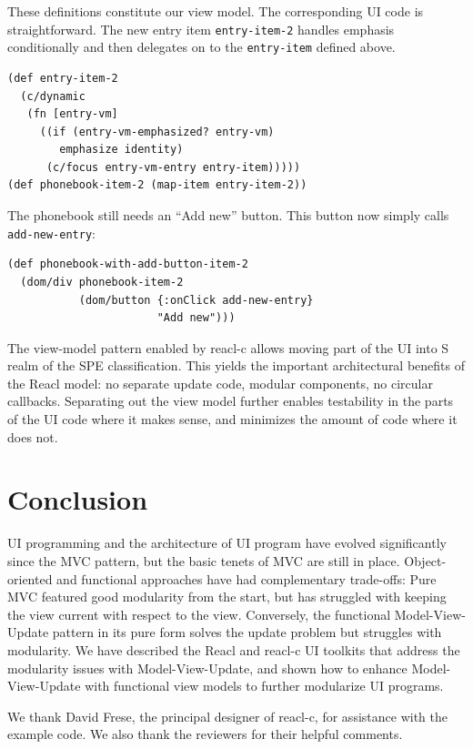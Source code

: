 \documentclass[sigplan,screen]{acmart}
\begin{document}
These definitions constitute our view model. The corresponding
UI code is straightforward. The new entry item \texttt{entry-item-2}
handles emphasis conditionally and then delegates on to the
\texttt{entry-item} defined above.
%
\begin{verbatim}
(def entry-item-2
  (c/dynamic
   (fn [entry-vm]
     ((if (entry-vm-emphasized? entry-vm)
        emphasize identity)
      (c/focus entry-vm-entry entry-item)))))
(def phonebook-item-2 (map-item entry-item-2))
\end{verbatim}
%
The phonebook still needs an ``Add new'' button. This button
now simply calls \texttt{add-new-entry}:
%
\begin{verbatim}
(def phonebook-with-add-button-item-2
  (dom/div phonebook-item-2
           (dom/button {:onClick add-new-entry}
                       "Add new")))
\end{verbatim}
%
The view-model pattern enabled by reacl-c allows moving part of the UI
into S realm of the SPE classification.  This yields the important
architectural benefits of the Reacl model: no separate update code,
modular components, no circular callbacks.  Separating out the view
model further enables testability in the parts of the UI code where it
makes sense, and minimizes the amount of code where it does not.

\section{Conclusion}
\label{sec:conclusion}

UI programming and the architecture of UI program have evolved
significantly since the MVC pattern, but the basic tenets of
MVC are still in place.  Object-oriented and functional approaches
have had complementary trade-offs: Pure MVC featured good modularity
from the start, but has struggled with keeping the view current with
respect to the view.
Conversely, the functional Model-View-Update pattern in its pure form
solves the update problem but struggles with modularity.  We have
described the Reacl and reacl-c UI toolkits that address the
modularity issues with Model-View-Update, and shown how to enhance
Model-View-Update with functional view models to further modularize UI
programs.

\begin{acks}
  We thank David Frese, the principal designer of reacl-c, for
  assistance with the example code.  We also thank the reviewers for
  their helpful comments.
\end{acks}



\end{document}
